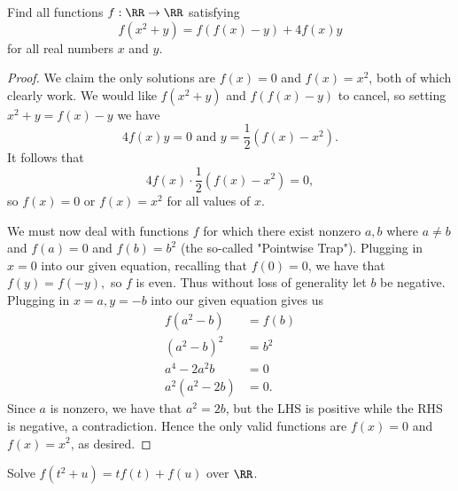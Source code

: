 \documentclass[letterpaper,oneside]{scrartcl}
\begin{document}
\newpage
\begin{problem*}
  Find all functions \(f: \RR \rightarrow \RR\) satisfying 
  \[f(x^2+y) = f(f(x)-y)+4f(x)y\]
  for all real numbers \(x\) and \(y\).
\end{problem*}
\begin{proof}
  We claim the only solutions are \(f(x)=0\) and \(f(x)=x^2\), both of which clearly work. We would like \(f(x^2+y)\) and \(f(f(x)-y)\) to cancel, so setting \(x^2+y=f(x)-y\) we have 
  \[4f(x)y = 0 \text{ and } y = \frac12\left(f(x)-x^2\right).\]
  It follows that
    \[4f(x)\cdot\frac12(f(x)-x^2) = 0,\]
  so \(f(x)=0\) or \(f(x)=x^2\) for all values of \(x\).
  
  We must now deal with functions \(f\) for which there exist nonzero \(a,b\) where \(a \neq b\) and \(f(a)=0\) and \(f(b)=b^2\) (the so-called "Pointwise Trap"). Plugging in \(x=0\) into our given equation, recalling that \(f(0)=0\), we have that \(f(y)=f(-y),\) so \(f\) is even. Thus without loss of generality let \(b\) be negative. Plugging in \(x=a, y=-b\) into our given equation gives us 
  \begin{align*}
    f(a^2-b) &= f(b) \\
    (a^2-b)^2 &= b^2 \\
    a^4-2a^2b &= 0 \\
    a^2(a^2-2b) &= 0.
  \end{align*}
  Since \(a\) is nonzero, we have that \(a^2 = 2b\), but the LHS is positive while the RHS is negative, a contradiction. Hence the only valid functions are \(f(x)=0\) and \(f(x)=x^2\), as desired.
\end{proof}
\newpage
\begin{problem*}
  Solve \(f(t^2+u)=tf(t)+f(u)\) over \(\RR\).
\end{problem*}
\end{document}
